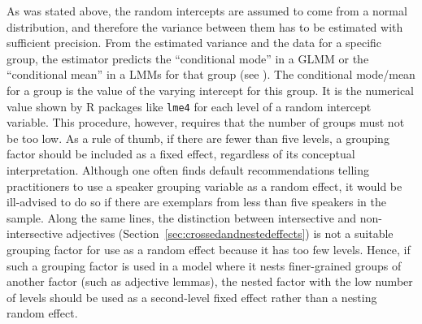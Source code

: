 As was stated above, the random intercepts are assumed to come from a normal distribution, and therefore the variance between them has to be estimated with sufficient precision.
From the estimated variance and the data for a specific group, the estimator predicts the ``conditional mode'' in a GLMM or the ``conditional mean'' in a LMMs for that group (see \citealt[Ch.~1]{Bates2010}).
The conditional mode\slash mean for a group is the value of the varying intercept for this group.
It is the numerical value shown by R packages like \texttt{lme4} for each level of a random intercept variable.
This procedure, however, requires that the number of groups must not be too low.
As a rule of thumb, if there are fewer than five levels, a grouping factor should be included as a fixed effect, regardless of its conceptual interpretation.
Although one often finds default recommendations telling practitioners to use a speaker grouping variable as a random effect, it would be ill-advised to do so if there are exemplars from less than five speakers in the sample.
Along the same lines, the distinction between intersective and non-intersective adjectives (Section~\ref{sec:crossedandnestedeffects}) is not a suitable grouping factor for use as a random effect because it has too few levels.
Hence, if such a grouping factor is used in a model where it nests finer-grained groups of another factor (such as adjective lemmas), the nested factor with the low number of levels should be used as a second-level fixed effect rather than a nesting random effect.

